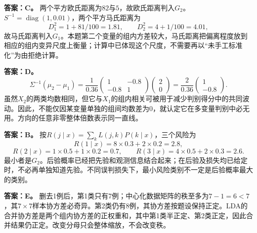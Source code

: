 \textbf{答案：C。} 两个平方欧氏距离为$82$与$5$，故欧氏距离判入$G_2$。$S^{-1}=\operatorname{diag}(1,0.01)$，两个平方马氏距离为
\[
D_1^2=1+81/100=1.81,\qquad D_2^2=4+1/100=4.01,
\]
故马氏距离判入$G_1$。本题第二个变量的组内方差较大，马氏距离把偏离程度放到相应的组内变异尺度上衡量；计算中已体现这个尺度，不需要再以“未手工标准化”为由拒绝计算。
\par\nobreak\smallskip{}

\textbf{答案：D。} \[
\Sigma^{-1}(\mu_2-\mu_1)
=\frac1{0.36}\begin{pmatrix}1&-0.8\\-0.8&1\end{pmatrix}
\begin{pmatrix}2\\0\end{pmatrix}
=\frac{2}{0.36}\begin{pmatrix}1\\-0.8\end{pmatrix}.
\]
虽然$X_2$的两类均数相同，但它与$X_1$的组内相关可被用于减少判别得分中的共同波动。因此，不能仅因某变量单独的组间均数差为0，就认定它在多变量判别中必无用。方向的任意非零整体倍数表示同一直线。
\par\nobreak\smallskip{}

\textbf{答案：B。} 按$R(j\mid x)=\sum_k L(j,k)P(k\mid x)$，三个风险为
\[
R(1\mid x)=8\times0.3+2\times0.2=2.8,
\]
\[
R(2\mid x)=1\times0.5+1\times0.2=0.7,\qquad
R(3\mid x)=4\times0.5+2\times0.3=2.6.
\]
最小者是$G_2$。后验概率已经把先验和观测信息结合起来；在后验及损失均已给定时，不必再单独知道先验。不同误判损失下，最小风险类别不一定是后验概率最大的类别。
\par\nobreak\smallskip{}

\textbf{答案：E。} 删去1例后，第1类只有7例；中心化数据矩阵的秩至多为$7-1=6<7$，其$7\times7$样本协方差必奇异。第2类仍有8例，其协方差按题设保持正定。LDA的合并协方差是两个组内协方差的正权重和，其中第1类半正定、第2类正定，因此合并结果仍正定。改变分母只会整体缩放，不会改变秩。
\par\nobreak\smallskip{}

